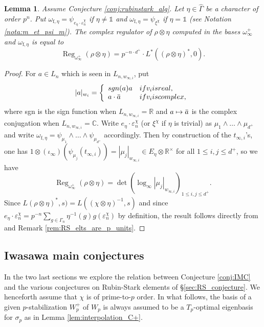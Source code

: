\documentclass[12pt]{amsart}
\newcommand\bR{\mathbb{R}}
\newcommand\bC{\mathbb{C}}
\newcommand{\ob}[1]{\mkern 1.5mu\overline{\mkern-1.5mu#1\mkern-1.5mu}\mkern 1.5mu}
\DeclareMathOperator{\Reg}{Reg}
\newcommand{\ff}{\mathrm{f}}
\theoremstyle{defstyle}
\theoremstyle{thmstyle}
\newtheorem{lemme}[subsubsection]{Lemma}
\begin{document}
\begin{lemme}\label{lem:calcul_reg_complexe_RS}
	Assume Conjecture \ref{conj:rubinstark_alg}. Let $\eta \in \widehat{\Gamma}$ be a character of order $p^{n}$. Put $\omega_{\ff,\eta}=\psi_{e_\eta\cdot \varepsilon_n^\chi}$ if $\eta\neq\mathds{1}$ and $\omega_{\ff,\eta}=\psi_{\xi^\chi}$ if $\eta=\mathds{1}$ (see Notation \ref{nota:m_et_psi_m}). The complex regulator of $\rho\otimes\eta$ computed in the bases $\omega_\infty^+$ and $\omega_{\ff,\eta}$ is equal to
	$$\Reg_{\omega_\infty^+}(\rho\otimes \eta)= p^{-n\cdot d^+}\cdot L^*((\rho\otimes \eta)^*,0).$$
\end{lemme}
\begin{proof}
 For $a \in L_n$ which is seen in $L_{n,w_{\infty,i}}$, put 
$$|a|_{w_i}=\left\{\begin{array}{ll}
\textrm{sgn}(a)a &  \textrm{if } v_i \textrm{ is real,}\\ 
a\cdot \ob{a} &  \textrm{if } v_i \textrm{ is complex,}
\end{array}\right.$$
where sgn is the sign function when $L_{n,w_{\infty,i}}=\bR$ and $a\mapsto \ob{a}$ is the complex conjugation when $L_{n,w_{\infty,i}}=\bC$. Write $e_\eta \cdot \varepsilon_n^{\chi}$ (or $\xi^\chi$ if $\eta$ is trivial) as $\mu_1\wedge\ldots\wedge\mu_{d^+}$ and write $\omega_{\ff,\eta}=\psi_{\mu_1}\wedge\ldots\wedge\psi_{\mu_{d^+}}$ accordingly. Then by construction of the $t_{\infty,i}$'s, one has $1\otimes (\iota_\infty)(\psi_{\mu_{j}}(t_{\infty,i}))=|\mu_j|_{w_{\infty,i}}\in E_\eta \otimes \bR^\times$ for all $1\leq i,j\leq d^+$, so we have
$$\Reg_{\omega_\infty^+}(\rho\otimes \eta)= \det\left(\log_\infty|\mu_j|_{w_{\infty,i}}\right)_{1\leq i,j\leq d^+}.$$
Since $L(\rho\otimes\eta)^*,s)=L((\chi\otimes\eta)^{-1},s)$ and since $e_\eta \cdot \varepsilon_n^{\chi}=p^{-n} \sum_{g\in\Gamma_n}\eta^{-1}(g)g(\varepsilon_n^{\chi})$ by definition, the result follows directly from \cite[Lem. 2.2]{rubinstark} and Remark \ref{rem:RS_elts_are_p_units}.
\end{proof}

\subsection{Iwasawa main conjectures}
In the two last sections we explore the relation between Conjecture \ref{conj:IMC} and the various conjectures on Rubin-Stark elements of \S\ref{sec:RS_conjecture}. We henceforth assume that $\chi$ is of prime-to-$p$ order. In what follows, the basis of a given $p$-stabilization $W_p^+$ of $W_p$ is always assumed to be a $T_p$-optimal eigenbasis for $\sigma_p$ as in Lemma \ref{lem:interpolation_C+}.
\end{document}
